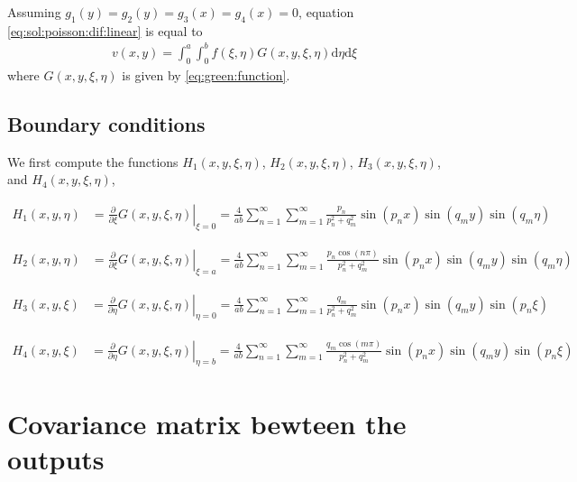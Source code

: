\documentclass[a4paper,10pt]{article}
\newcommand{\dif}{\textrm{d}}
\begin{document}
Assuming $g_1(y) = g_2(y)= g_3(x) = g_4(x) = 0$, equation \eqref{eq:sol:poisson:dif:linear} is equal to
\begin{align}
v(x,y)= \int_{0}^{a}\int_{0}^{b}f(\xi,\eta)G(x, y,\xi,\eta)\dif{\eta}\dif{\xi}\label{eq:sol:poisson:dif:linear:init:hom}
\end{align}
where $G(x, y, \xi,\eta)$ is given by \eqref{eq:green:function}.

\subsection*{Boundary conditions}

We first compute the functions $H_1(x, y, \xi, \eta)$, $H_2(x, y, \xi, \eta)$,
$H_3(x, y, \xi, \eta)$, and $H_4(x, y, \xi, \eta)$,

\begin{align*}
  H_1(x, y,\eta)& =\left.\frac{\partial}{\partial\xi}G(x, y, \xi,\eta)\right|_{\xi=0}
  = \frac{4}{ab}\sum_{n=1}^\infty
                  \sum_{m=1}^\infty \frac{p_n}{p_n^2 + q_m^2}\sin\left({p_n x}\right)
\sin\left(q_m y\right)\sin\left(q_m \eta\right)
\end{align*}

\begin{align*}
  H_2(x, y,\eta)& =\left.\frac{\partial}{\partial\xi}G(x, y, \xi,\eta)\right|_{\xi=a}
  = \frac{4}{ab}\sum_{n=1}^\infty
  \sum_{m=1}^\infty\frac{p_n\cos(n\pi)}{p_n^2 + q_m^2}
  \sin\left({p_n x}\right)\sin\left(q_m y\right)\sin\left(q_m \eta\right)
\end{align*}

\begin{align*}
  H_3(x, y,\xi)& =\left.\frac{\partial}{\partial\eta}G(x, y, \xi,\eta)\right|_{\eta=0}
  = \frac{4}{ab}\sum_{n=1}^\infty
                  \sum_{m=1}^\infty \frac{q_m}{p_n^2 + q_m^2}\sin\left({p_n x}\right)
\sin\left(q_m y\right)\sin\left(p_n \xi\right)
\end{align*}

\begin{align*}
  H_4(x, y,\xi)& =\left.\frac{\partial}{\partial\eta}G(x, y, \xi,\eta)\right|_{\eta=b}
  = \frac{4}{ab}\sum_{n=1}^\infty
  \sum_{m=1}^\infty\frac{q_m\cos(m\pi)}{p_n^2 + q_m^2}
  \sin\left({p_n x}\right)\sin\left(q_m y\right)\sin\left(p_n \xi\right)
\end{align*}



\section{Covariance matrix bewteen the outputs}
\end{document}
